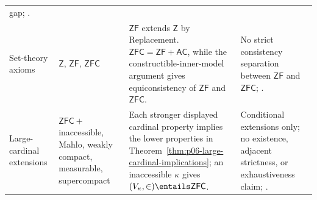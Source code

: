 \begin{longtable}{@{}p{}p{}p{}p{}@{}}
gap; \cite{Jech2003,Simpson2009}. \\
\addlinespace
Set-theory axioms &
\(\mathsf Z\), \(\mathsf{ZF}\), \(\mathsf{ZFC}\) &
\(\mathsf{ZF}\) extends \(\mathsf Z\) by Replacement.
\(\mathsf{ZFC}=\mathsf{ZF}+\mathsf{AC}\), while the constructible-inner-model
argument gives equiconsistency of \(\mathsf{ZF}\) and \(\mathsf{ZFC}\). &
No strict consistency separation between \(\mathsf{ZF}\) and
\(\mathsf{ZFC}\); \cite{Godel1938,Jech2003}. \\
\addlinespace
Large-cardinal extensions &
\(\mathsf{ZFC}+\) inaccessible, Mahlo, weakly compact, measurable,
supercompact &
Each stronger displayed cardinal property implies the lower properties in
Theorem~\ref{thm:p06-large-cardinal-implications}; an inaccessible
\(\kappa\) gives \((V_\kappa,\in)\entails\mathsf{ZFC}\). &
Conditional extensions only; no existence, adjacent strictness, or
exhaustiveness claim; \cite{Kanamori2003}. \\
\bottomrule
\end{longtable}
\endgroup

